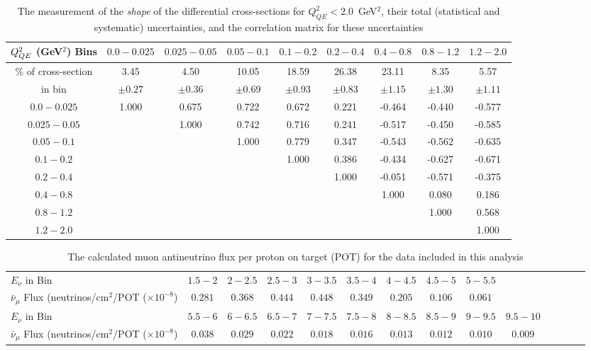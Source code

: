 \begingroup
\squeezetable
\begin{table}[!h]
\tabcolsep=0.11cm
\begin{tabular}{c|cccccccc}
\hline
$Q^2_{QE}$ (GeV$^2$) Bins & $0.0 - 0.025$ & $0.025 - 0.05$ & $0.05 - 0.1$ & $0.1 - 0.2$ & $0.2 - 0.4$ & $0.4 - 0.8$ & $0.8 - 1.2$ & $1.2 - 2.0$ \\ 
\hline
\% of cross-section   
& 3.45	& 4.50	& 10.05	& 18.59	& 26.38	& 23.11	& 8.35	& 5.57	\\
in bin
& $\pm	0.27	$ & $\pm	0.36	$ & $\pm	0.69	$ & $\pm	0.93	$ & $\pm	0.83	$  &$\pm	1.15	$ & $\pm	1.30	$ &	$\pm	1.11$ \\
\hline
$0.0 - 0.025$  & 1.000 & 0.675 & 0.722 & 0.672 & 0.221 & -0.464 & -0.440 & -0.577 \\ 
$0.025 - 0.05$  &  & 1.000 & 0.742 & 0.716 & 0.241 & -0.517 & -0.450 & -0.585 \\ 
$0.05 - 0.1$  &  &  & 1.000 & 0.779 & 0.347 & -0.543 & -0.562 & -0.635 \\ 
$0.1 - 0.2$  &  &  &  & 1.000 & 0.386 & -0.434 & -0.627 & -0.671 \\ 
$0.2 - 0.4$  &  &  &  &  & 1.000 & -0.051 & -0.571 & -0.375 \\ 
$0.4 - 0.8$  &  &  &  &  &  & 1.000 & 0.080 & 0.186 \\ 
$0.8 - 1.2$  &  &  &  &  &  &  & 1.000 & 0.568 \\ 
$1.2 - 2.0$  &  &  &  &  &  &  &  & 1.000 \\ 
\hline
\end{tabular}
\caption{The measurement of the {\em shape} of the differential cross-sections for $Q^2_{QE}<2.0$~GeV$^2$, their total (statistical and systematic) uncertainties, and the correlation matrix for these uncertainties}
\end{table}
\endgroup

\begingroup
\squeezetable
\begin{table}[!h]
\tabcolsep=0.11cm
\begin{tabular}{l|ccccccccccccc}
\hline 
$E_\nu$ in Bin & 
$1.5 - 2$ &
$2 - 2.5$ &
$2.5 - 3$ &
$3 - 3.5$ &
$3.5 - 4$ &
$4 - 4.5$ &
$4.5 - 5$ &
$5 - 5.5$ \\
$\bar\nu_\mu$ Flux
(neutrinos/cm$^2$/POT ($\times 10^{-8}$) &
$0.281$	& 
$0.368$	&
$0.444$	&
$0.448$	&
$0.349$	&
$0.205$	&
$0.106$	&
$0.061$	\\
\hline
$E_\nu$ in Bin & 
$5.5 - 6$ &
$6 - 6.5$ &
$6.5 - 7$ &
$7 - 7.5$ &
$7.5 - 8$ &
$8 - 8.5$ &
$8.5 - 9$ &
$9 - 9.5$ &
$9.5 - 10$ \\
$\bar\nu_\mu$ Flux
(neutrinos/cm$^2$/POT ($\times 10^{-8}$) &
$0.038$	&
$0.029$	&
$0.022$	&
$0.018$	&
$0.016$	&
$0.013$	&
$0.012$	&
$0.010$	&
$0.009$	\\ \hline
\end{tabular}
\caption{The calculated muon antineutrino flux per proton on target (POT) for the data included in this analysis}
\end{table}
\endgroup
